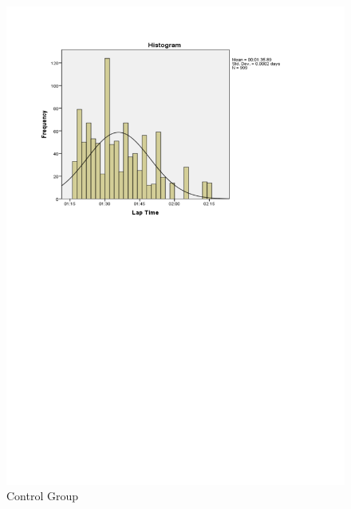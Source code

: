 \begin{figure}
	\centering
	\begin{minipage}{0.45\textwidth}
		\centering
		\includegraphics[width=\textwidth]{charts/2-0}
		Control Group
	\end{minipage}\hfill
	\begin{minipage}{0.45\textwidth}
		\centering

\end{minipage}
\end{figure}
